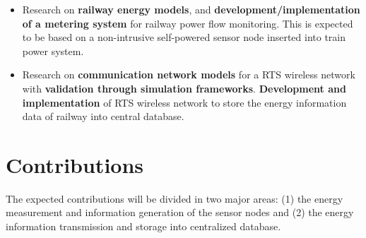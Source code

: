 
\begin{itemize}
	\setlength\itemsep{0em}
	
	\item	Research on \textbf{railway energy models}, and \textbf{development/implementation of a metering system} for railway power flow monitoring.
	This is expected to be based on a non-intrusive self-powered sensor node inserted into train power system.

	\item Research on \textbf{communication network models} for a RTS wireless network with \textbf{validation through simulation frameworks}.
	\textbf{Development and implementation} of RTS wireless network to store the energy information data of railway into central database.

	
\end{itemize}

\newpage
\section{Contributions}

The expected contributions will be divided in two major areas: (1) the energy measurement and information generation of the sensor nodes and (2) the energy information transmission and storage into centralized database.

